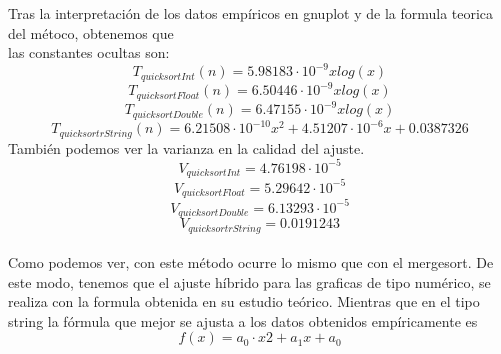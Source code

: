 \documentclass[11pt]{article}
\begin{document}
Tras la interpretación de los datos empíricos en gnuplot y de la formula teorica del métoco, obtenemos que \\
las constantes ocultas son:
\begin{equation*}
    T_{quicksortInt}(n)=5.98183\cdot 10^{-9}x log(x)
\end{equation*}
\begin{equation*}
    T_{quicksortFloat}(n)=6.50446\cdot 10^{-9}x log(x)
\end{equation*}
\begin{equation*}
    T_{quicksortDouble}(n)=6.47155\cdot 10^{-9}x log(x)
\end{equation*}
\begin{equation*}
    T_{quicksortrString}(n)=6.21508 \cdot 10^{-10}x^{2}+4.51207 \cdot 10^{-6}x+0.0387326 
\end{equation*}
También podemos ver la varianza en la calidad del ajuste. 
\begin{equation*}
    V_{quicksortInt}=4.76198\cdot 10^{-5}
\end{equation*}
\begin{equation*}
    V_{quicksortFloat}=5.29642\cdot 10^{-5}
\end{equation*}
\begin{equation*}
    V_{quicksortDouble}=6.13293 \cdot 10^{-5}
\end{equation*}
\begin{equation*}
    V_{quicksortrString}=0.0191243 
\end{equation*}
\\
Como podemos ver, con este método ocurre lo mismo que con el mergesort. De este modo, tenemos que el ajuste híbrido
para las graficas de tipo numérico, se realiza con la formula obtenida en su estudio teórico. Mientras que en el tipo
string la fórmula que mejor se ajusta a los datos obtenidos empíricamente es
\begin{equation*}
    f(x)=a_0 \cdot x{2} + a_1 x + a_0
\end{equation*}
\end{document}
